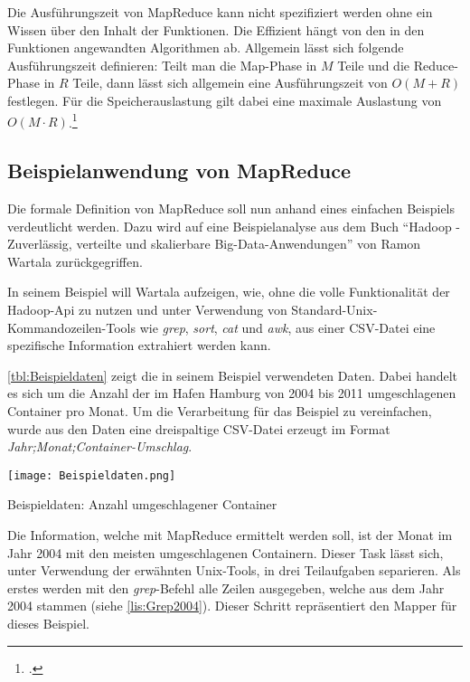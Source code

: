 Die Ausführungszeit von MapReduce kann nicht spezifiziert werden ohne ein Wissen über den Inhalt der Funktionen. Die Effizient hängt von den in den Funktionen angewandten Algorithmen ab. Allgemein lässt sich folgende Ausführungszeit definieren: Teilt man die Map-Phase in $M$ Teile und die Reduce-Phase in $R$ Teile, dann lässt sich allgemein eine Ausführungszeit von $O(M+R)$ festlegen. Für die Speicherauslastung gilt dabei eine maximale Auslastung von $O(M \cdot R)$.\footcite[Vgl.][S. 5]{Dean.2004}

\subsection{Beispielanwendung von MapReduce}\label{subsec:Beispielanwendung}
Die formale Definition von MapReduce soll nun anhand eines einfachen Beispiels verdeutlicht werden. Dazu wird auf eine Beispielanalyse aus dem Buch "`Hadoop - Zuverlässig, verteilte und skalierbare Big-Data-Anwendungen"' von Ramon Wartala zurückgegriffen.

In seinem Beispiel will Wartala aufzeigen, wie, ohne die volle Funktionalität der Hadoop-Api zu nutzen und unter Verwendung von Standard-Unix-Kommandozeilen-Tools wie \textit{grep}, \textit{sort}, \textit{cat} und \textit{awk}, aus einer CSV-Datei eine spezifische Information extrahiert werden kann.

\autoref{tbl:Beispieldaten} zeigt die in seinem Beispiel verwendeten Daten. Dabei handelt es sich um die Anzahl der im Hafen Hamburg von 2004 bis 2011 umgeschlagenen Container pro Monat. Um die Verarbeitung für das Beispiel zu vereinfachen, wurde aus den Daten eine dreispaltige CSV-Datei erzeugt im Format \textit{Jahr;Monat;Container-Umschlag}.

\pagebreak
\begin{table}[h]
	\texttt{[image: Beispieldaten.png]}
	\caption{Beispieldaten: Anzahl umgeschlagener Container\footnotemark}
	\label{tbl:Beispieldaten}
\end{table}

Die Information, welche mit MapReduce ermittelt werden soll, ist der Monat im Jahr 2004 mit den meisten umgeschlagenen Containern. Dieser Task lässt sich, unter Verwendung der erwähnten Unix-Tools, in drei Teilaufgaben separieren. Als erstes werden mit den \textit{grep}-Befehl alle Zeilen ausgegeben, welche aus dem Jahr 2004 stammen (siehe \autoref{lis:Grep2004}). Dieser Schritt repräsentiert den Mapper für dieses Beispiel. \\

